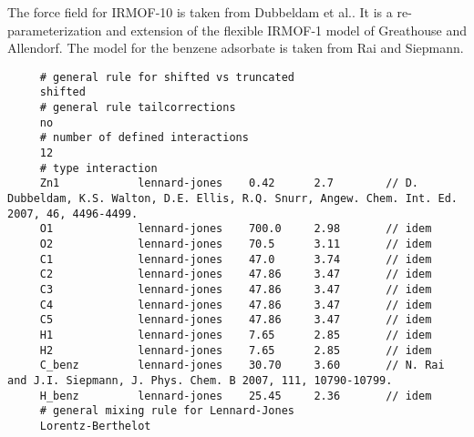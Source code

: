 \noindent
The force field for IRMOF-10 is taken from Dubbeldam et al.\cite{Dubbeldam2007}. It is a re-parameterization and extension of the flexible IRMOF-1
model of Greathouse and Allendorf\cite{Greathouse2008}.
The model for the benzene adsorbate is taken from Rai and Siepmann\cite{Rai2007}.
\begin{tiny}
\begin{verbatim}
     # general rule for shifted vs truncated
     shifted
     # general rule tailcorrections
     no
     # number of defined interactions
     12
     # type interaction
     Zn1            lennard-jones    0.42      2.7        // D. Dubbeldam, K.S. Walton, D.E. Ellis, R.Q. Snurr, Angew. Chem. Int. Ed. 2007, 46, 4496-4499.
     O1             lennard-jones    700.0     2.98       // idem
     O2             lennard-jones    70.5      3.11       // idem
     C1             lennard-jones    47.0      3.74       // idem
     C2             lennard-jones    47.86     3.47       // idem
     C3             lennard-jones    47.86     3.47       // idem
     C4             lennard-jones    47.86     3.47       // idem
     C5             lennard-jones    47.86     3.47       // idem
     H1             lennard-jones    7.65      2.85       // idem
     H2             lennard-jones    7.65      2.85       // idem
     C_benz         lennard-jones    30.70     3.60       // N. Rai and J.I. Siepmann, J. Phys. Chem. B 2007, 111, 10790-10799.
     H_benz         lennard-jones    25.45     2.36       // idem
     # general mixing rule for Lennard-Jones
     Lorentz-Berthelot
\end{verbatim}
\end{tiny}

